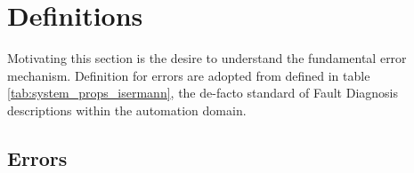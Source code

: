 

\newpage


\section{Definitions}
Motivating this section is the desire to understand the fundamental error mechanism. Definition for errors are adopted from \textcite{isermann_fault-diagnosis_2006} defined in table \ref{tab:system_props_isermann}, the de-facto standard of Fault Diagnosis descriptions within the automation domain.


\subsection{Errors}

